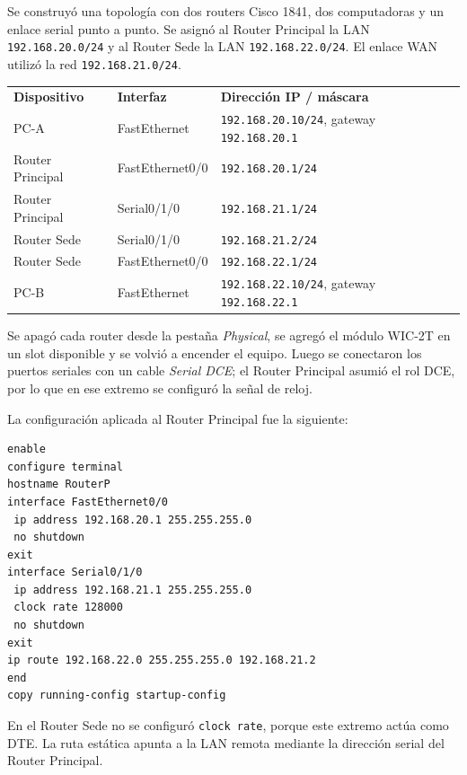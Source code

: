 \documentclass[a4paper,12pt]{article}
\newcommand{\ip}[1]{\texttt{#1}}
\begin{document}
Se construyó una topología con dos routers Cisco 1841, dos computadoras y un enlace serial punto a punto. Se asignó al Router Principal la LAN \ip{192.168.20.0/24} y al Router Sede la LAN \ip{192.168.22.0/24}. El enlace WAN utilizó la red \ip{192.168.21.0/24}.


\begin{center}
\begin{tabular}{lll}
\textbf{Dispositivo} & \textbf{Interfaz} & \textbf{Dirección IP / máscara} \\
PC-A & FastEthernet & \ip{192.168.20.10/24}, gateway \ip{192.168.20.1} \\
Router Principal & FastEthernet0/0 & \ip{192.168.20.1/24} \\
Router Principal & Serial0/1/0 & \ip{192.168.21.1/24} \\
Router Sede & Serial0/1/0 & \ip{192.168.21.2/24} \\
Router Sede & FastEthernet0/0 & \ip{192.168.22.1/24} \\
PC-B & FastEthernet & \ip{192.168.22.10/24}, gateway \ip{192.168.22.1} \\
\end{tabular}
\end{center}

Se apagó cada router desde la pestaña \textit{Physical}, se agregó el módulo WIC-2T en un slot disponible y se volvió a encender el equipo. Luego se conectaron los puertos seriales con un cable \textit{Serial DCE}; el Router Principal asumió el rol DCE, por lo que en ese extremo se configuró la señal de reloj.


La configuración aplicada al Router Principal fue la siguiente:

\begin{lstlisting}
enable
configure terminal
hostname RouterP
interface FastEthernet0/0
 ip address 192.168.20.1 255.255.255.0
 no shutdown
exit
interface Serial0/1/0
 ip address 192.168.21.1 255.255.255.0
 clock rate 128000
 no shutdown
exit
ip route 192.168.22.0 255.255.255.0 192.168.21.2
end
copy running-config startup-config
\end{lstlisting}

En el Router Sede no se configuró \texttt{clock rate}, porque este extremo actúa como DTE. La ruta estática apunta a la LAN remota mediante la dirección serial del Router Principal.
\end{document}
